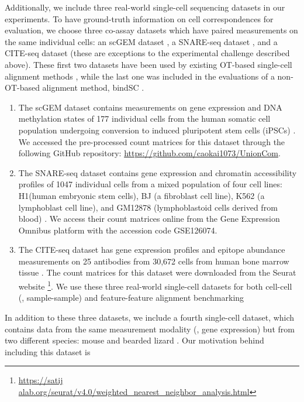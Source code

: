 Additionally, we include three real-world single-cell sequencing datasets in our experiments.
To have ground-truth information on cell correspondences for evaluation, we choose
three co-assay datasets which have paired measurements on the same individual cells:
an scGEM dataset \citep{cheow2016}, a SNARE-seq dataset \citep{SNAREseq}, and
a CITE-seq dataset \citep{CITEseq} (these are exceptions to the experimental challenge
described above). These first two datasets have been used by existing
OT-based single-cell alignment methods
\citep{cao2020unsupervised, singh20, Demetci20, Pamona, Demetci22},
while the last one was included in the evaluations of a non-OT-based alignment method,
bindSC \citep{bindSC}.
\begin{enumerate}
  \item The scGEM dataset contains measurements on gene expression and
  DNA methylation states of 177 individual cells from the human somatic cell population
  undergoing conversion to induced pluripotent stem cells (iPSCs) \citep{cheow2016}.
  We accessed the pre-processed count matrices for this dataset through the following
  GitHub repository: \url{https://github.com/caokai1073/UnionCom}.

  \item The SNARE-seq dataset contains
  gene expression and chromatin accessibility profiles of 1047 individual cells from
  a mixed population of four cell lines: H1(human embryonic stem cells), BJ (a fibroblast cell line),
  K562 (a lymphoblast cell line), and GM12878 (lymphoblastoid cells derived from blood)
  \citep{SNAREseq}. We access their count matrices online from the Gene Expression Omnibus platform
  with the accession code GSE126074.

  \item The CITE-seq dataset has gene expression profiles
  and epitope abundance measurements on 25 antibodies from 30,672 cells from
  human bone marrow tissue \citep{CITEseq}. The count matrices for this dataset were downloaded
  from the Seurat website
  \footnote{\url{https://satij alab.org/seurat/v4.0/weighted_nearest_neighbor_analysis.html}}.
  We use these three real-world single-cell datasets for both cell-cell (\ie, sample-sample)
  and feature-feature alignment benchmarking
\end{enumerate}
In addition to these three datasets,
we include a fourth single-cell dataset, which contains data from the same measurement modality
(\ie, gene expression) but from two different species: mouse \citep{mouse} and
bearded lizard \citep{lizard}. Our motivation behind including this dataset is
